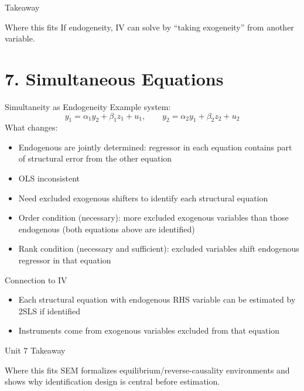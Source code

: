 \documentclass[aspectratio=169]{beamer}
\begin{document}
\begin{frame}{Takeaway}
\begin{block}{Where this fits}
If endogeneity, IV can solve by ``taking exogeneity'' from another variable.
\end{block}
\end{frame}

\section{7. Simultaneous Equations}

\begin{frame}{Simultaneity as Endogeneity}
Example system:
\[
y_1 = \alpha_1 y_2 + \beta_1 z_1 + u_1,\qquad
y_2 = \alpha_2 y_1 + \beta_2 z_2 + u_2
\]
What changes:
\begin{itemize}
	\item Endogenous are jointly determined: regressor in each equation contains part of structural error from the other equation
    \item OLS inconsistent
    \item Need excluded exogenous shifters to identify each structural equation
	\item Order condition (necessary): more excluded exogenous variables than those endogenous (both equations above are identified)
	\item Rank condition (necessary and sufficient): excluded variables shift endogenous regressor in that equation
\end{itemize}
\end{frame}


\begin{frame}{Connection to IV}
\begin{itemize}
	\item Each structural equation with endogenous RHS variable can be estimated by 2SLS if identified
	\item Instruments come from exogenous variables excluded from that equation
\end{itemize}
\end{frame}

\begin{frame}{Unit 7 Takeaway}
\begin{block}{Where this fits}
SEM formalizes equilibrium/reverse-causality environments and shows why identification design is central before estimation.
\end{block}
\end{frame}
\end{document}
